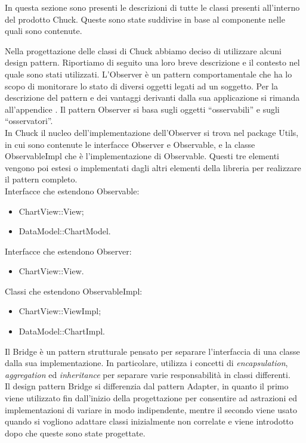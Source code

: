 	In questa sezione sono presenti le descrizioni di tutte le classi presenti all'interno del prodotto Chuck. Queste sono state suddivise in base al componente nelle quali sono contenute.
	
	
	
		Nella progettazione delle classi di Chuck abbiamo deciso di utilizzare alcuni design pattern. Riportiamo di seguito una loro breve descrizione e il contesto nel quale sono stati utilizzati.
			L'Observer è un pattern comportamentale che ha lo scopo di monitorare lo stato di diversi oggetti legati ad un soggetto.
			Per la descrizione del pattern e dei vantaggi derivanti dalla sua applicazione si rimanda all'appendice .
				Il pattern Observer si basa sugli oggetti “osservabili” e sugli “osservatori”. \\In Chuck il nucleo dell'implementazione dell'Observer si trova nel package Utils, in cui sono contenute le interfacce Observer e Observable, e la classe ObservableImpl che è l'implementazione di Observable. Questi tre elementi vengono poi estesi o implementati dagli altri elementi della libreria per realizzare il pattern completo.\\
				Interfacce che estendono Observable:
				\begin{itemize}
					\item ChartView::View;
					\item DataModel::ChartModel.
				\end{itemize}
				Interfacce che estendono Observer:
				\begin{itemize}
					\item ChartView::View.
				\end{itemize}
				Classi che estendono ObservableImpl:
				\begin{itemize}
					\item ChartView::ViewImpl;
					\item DataModel::ChartImpl.
				\end{itemize}
			Il Bridge è un pattern strutturale pensato per separare l'interfaccia di una classe dalla sua implementazione. In particolare, utilizza i concetti di \textit{encapsulation}, \textit{aggregation} ed \textit{inheritance} per separare varie responsabilità in classi differenti. \\
			Il design pattern Bridge si differenzia dal pattern Adapter, in quanto il primo viene utilizzato fin dall'inizio della progettazione per consentire ad astrazioni ed implementazioni di variare in modo indipendente, mentre il secondo viene usato quando si vogliono adattare classi inizialmente non correlate e viene introdotto dopo che queste sono state progettate.

